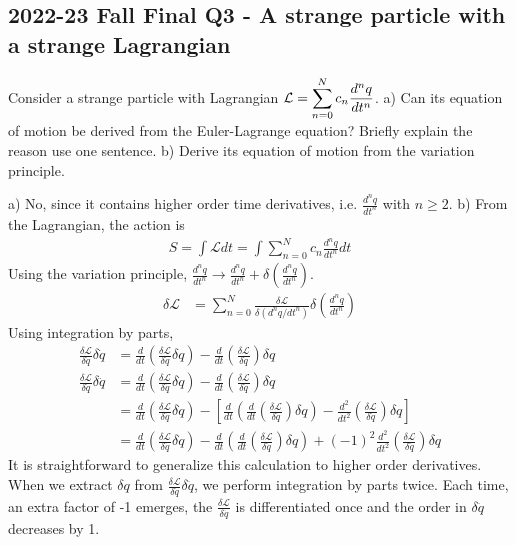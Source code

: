 \documentclass[12pt]{book} %
\numberwithin{equation}{chapter}
\def\d{\delta}
\def\La{\mathcal{L}}
\begin{document}
\subsection*{2022-23 Fall Final Q3 - A strange particle with a strange Lagrangian}
\label{A strange particle with a strange Lagrangian}
Consider a strange particle with Lagrangian $\mathlarger{\La=\sum_{n=0}^{N}c_{n}\frac{d^{n}q}{dt^{n}}}$.\bigskip\newline
a) Can its equation of motion be derived from the Euler-Lagrange equation? Briefly explain the reason use one sentence.\bigskip\newline
b) Derive its equation of motion from the variation principle.

\begin{solbox}
a) No, since it contains higher order time derivatives, i.e. $\frac{d^{n}q}{dt^{n}}$ with $n\geq2$.\bigskip\newline
b) From the Lagrangian, the action is
\begin{align*}
    S=\int \La dt=\int \sum_{n=0}^{N}c_{n}\frac{d^{n}q}{dt^{n}}dt
\end{align*}
Using the variation principle, $\frac{d^{n}q}{dt^{n}}\to\frac{d^{n}q}{dt^{n}}+\d\left(\frac{d^{n}q}{dt^{n}}\right)$.
\begin{align*}
\d\La&=\sum_{n=0}^{N}\frac{\d\La}{\d(d^{n}q/dt^{n})}\d\left(\frac{d^{n}q}{dt^{n}}\right)
\end{align*}
Using integration by parts,
\begin{align*}
\frac{\d\La}{\d\dot{q}}\d\dot{q}&=\frac{d}{dt}\left(\frac{\d\La}{\d\dot{q}}\d q\right)-\frac{d}{dt}\left(\frac{\d\La}{\d\dot{q}}\right)\d q\\
\frac{\d\La}{\d\ddot{q}}\d\ddot{q}&=\frac{d}{dt}\left(\frac{\d\La}{\d\ddot{q}}\d\dot{q}\right)-\frac{d}{dt}\left(\frac{\d\La}{\d\ddot{q}}\right)\d\dot{q}\\
&=\frac{d}{dt}\left(\frac{\d\La}{\d\ddot{q}}\d\dot{q}\right)-\left[\frac{d}{dt}\left(\frac{d}{dt}\left(\frac{\d\La}{\d\ddot{q}}\right)\d q\right)-\frac{d^{2}}{dt^{2}}\left(\frac{\d\La}{\d\ddot{q}}\right)\d q\right]\\
&=\frac{d}{dt}\left(\frac{\d\La}{\d\ddot{q}}\d\dot{q}\right)-\frac{d}{dt}\left(\frac{d}{dt}\left(\frac{\d\La}{\d\ddot{q}}\right)\d q\right)+(-1)^{2}\frac{d^{2}}{dt^{2}}\left(\frac{\d\La}{\d\ddot{q}}\right)\d q
\end{align*}
It is straightforward to generalize this calculation to higher order derivatives. When we extract $\d q$ from $\frac{\d\La}{\d\ddot{q}}\d\ddot{q}$, we perform integration by parts twice. Each time, an extra factor of -1 emerges, the $\frac{\d\La}{\d\ddot{q}}$ is differentiated once and the order in $\d\ddot{q}$ decreases by 1.\bigskip\newline

\end{solbox}
\end{document}
